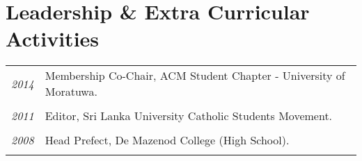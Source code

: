 \documentclass[a4paper,10pt]{article}
\begin{document}
\section{Leadership \& Extra Curricular Activities}
\begin{tabular}{p{3cm}p{13.5cm}}
\emph{2014} & Membership Co-Chair, ACM Student Chapter - University of Moratuwa.\\\\

\emph{2011} & Editor, Sri Lanka University Catholic Students Movement.\\\\
\emph{2008} & Head Prefect, De Mazenod College (High School).\\\\
\end{tabular}
\end{document}
